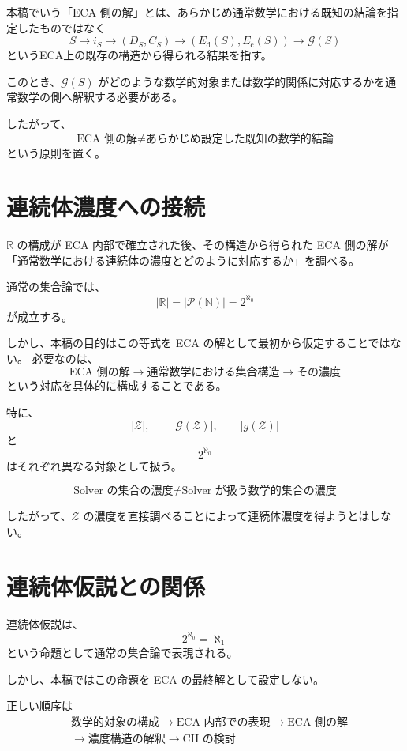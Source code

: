 \documentclass[a4paper,11pt]{article}
\begin{document}
本稿でいう「ECA 側の解」とは、あらかじめ通常数学における既知の結論を指定したものではなく
\[
\boxed{
S
\longrightarrow
i_S
\longrightarrow
(D_S,C_S)
\longrightarrow
(E_{\mathrm d}(S),E_{\mathrm c}(S))
\longrightarrow
\mathcal{G}(S)}
\]
というECA上の既存の構造から得られる結果を指す。

このとき、$\mathcal{G}(S)$ がどのような数学的対象または数学的関係に対応するかを通常数学の側へ解釈する必要がある。

したがって、
\[
\boxed{
\text{ECA 側の解}
\neq
\text{あらかじめ設定した既知の数学的結論}}
\]
という原則を置く。

\section{連続体濃度への接続}
\label{sec:continuum}

$\mathbb{R}$ の構成が ECA 内部で確立された後、その構造から得られた ECA 側の解が「通常数学における連続体の濃度とどのように対応するか」を調べる。

通常の集合論では、
\[
|\mathbb{R}|
=
|\mathcal{P}(\mathbb{N})|
=
2^{\aleph_0}
\]
が成立する。

しかし、本稿の目的はこの等式を ECA の解として最初から仮定することではない。
必要なのは、
\[
\boxed{
\text{ECA 側の解}
\longrightarrow
\text{通常数学における集合構造}
\longrightarrow
\text{その濃度}}
\]
という対応を具体的に構成することである。

特に、
\[
|\mathcal{Z}|,\qquad
|\mathcal{G}(\mathcal{Z})|,\qquad
|g(\mathcal{Z})|
\]
と
\[
2^{\aleph_0}
\]
はそれぞれ異なる対象として扱う。

\[
\boxed{
\text{Solver の集合の濃度}
\neq
\text{Solver が扱う数学的集合の濃度}}
\]

したがって、$\mathcal{Z}$ の濃度を直接調べることによって連続体濃度を得ようとはしない。

\section{連続体仮説との関係}
\label{sec:CH}

連続体仮説は、
\[
\boxed{2^{\aleph_0}=\aleph_1}
\]
という命題として通常の集合論で表現される。

しかし、本稿ではこの命題を ECA の最終解として設定しない。

正しい順序は
\[
\boxed{
\begin{aligned}
&\text{数学的対象の構成}
\longrightarrow
\text{ECA 内部での表現}
\longrightarrow
\text{ECA 側の解}\\
&\longrightarrow
\text{濃度構造の解釈}
\longrightarrow
\text{CH の検討}
\end{aligned}}
\]
\end{document}
